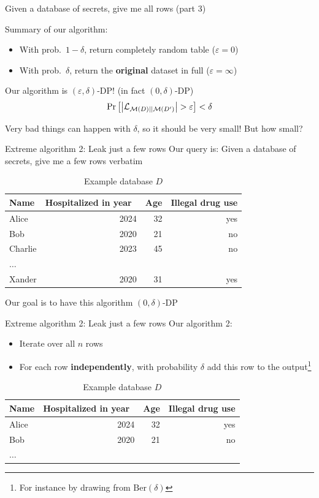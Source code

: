 \documentclass[12pt,aspectratio=169,handout]{beamer}
\begin{document}
\begin{frame}{Given a database of secrets, give me all rows (part 3)}

Summary of our algorithm:
\begin{itemize}
\item With prob.\ $1 - \delta$, return completely random table ($\varepsilon = 0$)
\item With prob.\ $\delta$, return the \textbf{original} dataset in full ($\varepsilon = \infty$)
\end{itemize}
Our algorithm is $(\varepsilon, \delta)$-DP! (in fact $(0, \delta)$-DP)
$$
\Pr\left[\abs{\mathcal{L}_{\mathcal{M}(D) || \mathcal{M}(D')}} > \varepsilon \right] < \delta
$$

Very bad things can happen with $\delta$, so it should be very small! But how small?
\end{frame}



\begin{frame}{Extreme algorithm 2: Leak just a few rows}
Our query is: Given a database of secrets, give me a few rows verbatim

\begin{table}
\footnotesize
\begin{tabular}{lrrr} \toprule
Name & Hospitalized in year & Age & Illegal drug use \\ \midrule
Alice & 2024 & 32 & yes \\
Bob & 2020 & 21 & no \\
Charlie & 2023 & 45 & no \\
$\ldots$ & & & \\
Xander & 2020 & 31 & yes \\ \bottomrule
\end{tabular}
\caption{Example database $D$}
\end{table}

Our goal is to have this algorithm $(0, \delta)$-DP

\end{frame}

\begin{frame}{Extreme algorithm 2: Leak just a few rows}
Our algorithm 2:
\begin{itemize}
\item Iterate over all $n$ rows
\item For each row \textbf{independently}, with probability $\delta$ add this row to the output\footnote{For instance by drawing from $\mathrm{Ber}(\delta)$}
\end{itemize}
\begin{table}
\footnotesize
\begin{tabular}{lrrr} \toprule
Name & Hospitalized in year & Age & Illegal drug use \\ \midrule
Alice & 2024 & 32 & yes \\
Bob & 2020 & 21 & no \\
$\ldots$ & & & \\ \bottomrule
\end{tabular}
\caption{Example database $D$}
\end{table}

\end{frame}
\end{document}
